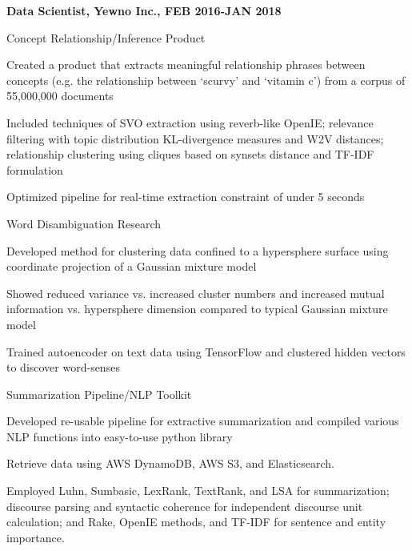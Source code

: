 \begin{cvlist}
 \item \textbf{Data Scientist, Yewno Inc., FEB 2016-JAN 2018}
 \begin{cvsublist}
    \item Concept Relationship/Inference Product
        \begin{cvsubsublist}
            \item Created a product that extracts meaningful relationship phrases between concepts 
                    (e.g. the relationship between `scurvy' and `vitamin c') from a corpus of 55,000,000 documents
            \item Included techniques of SVO extraction using reverb-like OpenIE; 
                    relevance filtering with topic distribution KL-divergence measures and W2V distances; 
                    relationship clustering using cliques based on synsets distance and TF-IDF formulation
            \item Optimized pipeline for real-time extraction constraint of under 5 seconds
             
        \end{cvsubsublist}
    \item Word Disambiguation Research
        \begin{cvsubsublist}
            \item Developed method for clustering data confined to a hypersphere surface using coordinate projection
                of a Gaussian mixture model
            \item Showed reduced variance vs. increased cluster numbers and increased mutual information vs. hypersphere dimension
                compared to typical Gaussian mixture model
            \item Trained autoencoder on text data using TensorFlow and clustered hidden vectors to discover word-senses
         \end{cvsubsublist}
    \item Summarization Pipeline/NLP Toolkit
        \begin{cvsubsublist}
            \item Developed re-usable pipeline for extractive summarization and 
                compiled various NLP functions into easy-to-use python library
            \item Retrieve data using AWS DynamoDB, AWS S3, and Elasticsearch.
            \item Employed Luhn, Sumbasic, LexRank, TextRank, and LSA for summarization; 
                discourse parsing and syntactic coherence for independent discourse unit calculation;
                and Rake, OpenIE methods, and TF-IDF for sentence and entity importance.
         \end{cvsubsublist}
  \end{cvsublist}


\end{cvlist}
